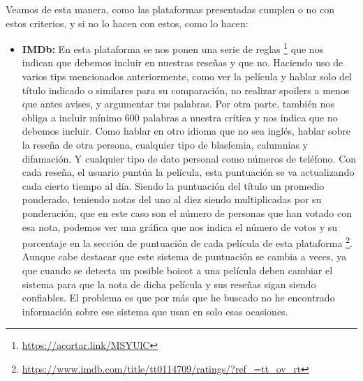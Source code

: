 Veamos de esta manera, como las plataformas presentadas cumplen o no con estos criterios, y si no lo hacen con estos, como lo hacen:

\begin{itemize}
\item \textbf{IMDb:} En esta plataforma se nos ponen una serie de reglas \footnote{\url{https://acortar.link/MSYUlC}} que nos indican que debemos incluir en nuestras reseñas y que no. Haciendo uso de varios tips mencionados anteriormente, como ver la película y hablar solo del título indicado o similares para su comparación, no realizar spoilers a menos que antes avises, y argumentar tus palabras. Por otra parte, también nos obliga a incluir mínimo 600 palabras a nuestra crítica y nos indica que no debemos incluir. Como hablar en otro idioma que no sea inglés, hablar sobre la reseña de otra persona, cualquier tipo de blasfemia, calumnias y difamación. Y cualquier tipo de dato personal como números de teléfono. Con cada reseña, el usuario puntúa la película, esta puntuación se va actualizando cada cierto tiempo al día. Siendo la puntuación del título un promedio ponderado, teniendo notas del uno al diez siendo multiplicadas por su ponderación, que en este caso son el número de personas que han votado con esa nota, podemos ver una gráfica que nos indica el número de votos y su porcentaje en la sección de puntuación de cada película de esta plataforma \footnote{\url{https://www.imdb.com/title/tt0114709/ratings/?ref_=tt_ov_rt}}. Aunque cabe destacar que este sistema de puntuación se cambia a veces, ya que cuando se detecta un posible boicot a una película deben cambiar el sistema para que la nota de dicha película y sus reseñas sigan siendo confiables. El problema es que por más que he buscado no he encontrado información sobre ese sistema que usan en solo esas ocasiones.

\end{itemize}
